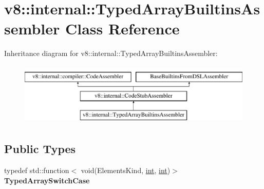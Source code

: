 \hypertarget{classv8_1_1internal_1_1TypedArrayBuiltinsAssembler}{}\section{v8\+:\+:internal\+:\+:Typed\+Array\+Builtins\+Assembler Class Reference}
\label{classv8_1_1internal_1_1TypedArrayBuiltinsAssembler}
Inheritance diagram for v8\+:\+:internal\+:\+:Typed\+Array\+Builtins\+Assembler\+:\begin{figure}[H]
\begin{center}
\leavevmode
\includegraphics[height=3.000000cm]{classv8_1_1internal_1_1TypedArrayBuiltinsAssembler}
\end{center}
\end{figure}
\subsection*{Public Types}
\begin{DoxyCompactItemize}
\item 
\mbox{\label{classv8_1_1internal_1_1TypedArrayBuiltinsAssembler_a44690d1ec9d1b31ed8662e77b92fd5b3}} 
typedef std\+::function$<$ void(Elements\+Kind, \mbox{\hyperlink{classint}{int}}, \mbox{\hyperlink{classint}{int}})$>$ {\bfseries Typed\+Array\+Switch\+Case}
\end{DoxyCompactItemize}
